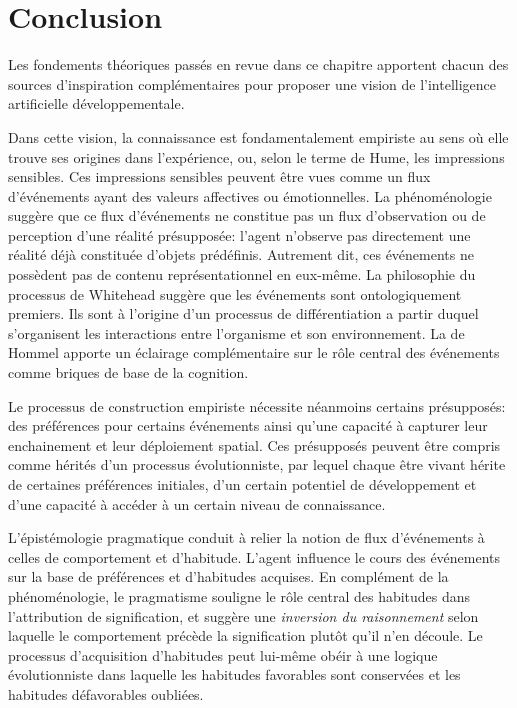 \section{Conclusion}
\label{sec:conclusion1}

\noindent
Les fondements théoriques passés en revue dans ce chapitre apportent chacun des sources d'inspiration complémentaires pour proposer une vision de l'intelligence artificielle développementale.

Dans cette vision, la connaissance est fondamentalement empiriste au sens où elle trouve ses origines dans l'expérience, ou, selon le terme de Hume, les impressions sensibles. 
Ces impressions sensibles peuvent être vues comme un flux d'événements ayant des valeurs affectives ou émotionnelles. 
La phénoménologie suggère que ce flux d'événements ne constitue pas un flux d'observation ou de perception d'une réalité présupposée:  l'agent n'observe pas directement une réalité déjà constituée d'objets prédéfinis.
Autrement dit, ces événements ne possèdent pas de contenu représentationnel en eux-même. 
La philosophie du processus de Whitehead suggère que les événements sont ontologiquement premiers.
Ils sont à l'origine d'un processus de différentiation a partir duquel s'organisent les interactions entre l'organisme et son environnement.
La  de Hommel apporte un éclairage complémentaire sur le rôle central des événements comme briques de base de la cognition.

Le processus de construction empiriste nécessite néanmoins certains présupposés: des préférences pour certains événements ainsi qu'une capacité à capturer leur enchainement et leur déploiement spatial.  
Ces présupposés peuvent être compris comme hérités d'un processus évolutionniste, par lequel chaque être vivant hérite de certaines préférences initiales, d'un certain potentiel de développement et d'une capacité à accéder à un certain niveau de connaissance.

L'épistémologie pragmatique conduit à relier la notion de flux d'événements à celles de comportement et d'habitude. 
L'agent influence le cours des événements sur la base de préférences et d'habitudes acquises.
En complément de la phénoménologie, le pragmatisme souligne le rôle central des habitudes dans l'attribution de signification, et suggère une \emph{inversion du raisonnement} selon laquelle le comportement précède la signification plutôt qu'il n'en découle.
Le processus d'acquisition d'habitudes peut lui-même obéir à une logique évolutionniste dans laquelle les habitudes favorables sont conservées et les habitudes défavorables oubliées.  


